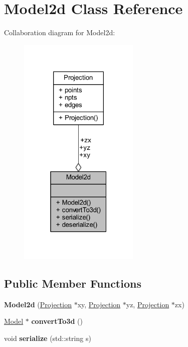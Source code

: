 \hypertarget{class_model2d}{}\section{Model2d Class Reference}
\label{class_model2d}


Collaboration diagram for Model2d\+:
\nopagebreak
\begin{figure}[H]
\begin{center}
\leavevmode
\includegraphics[width=163pt]{class_model2d__coll__graph}
\end{center}
\end{figure}
\subsection*{Public Member Functions}
\begin{DoxyCompactItemize}
\item 
\mbox{\label{class_model2d_aa07204b20301739146f8ecf525778720}} 
{\bfseries Model2d} (\mbox{\hyperlink{class_projection}{Projection}} $\ast$xy, \mbox{\hyperlink{class_projection}{Projection}} $\ast$yz, \mbox{\hyperlink{class_projection}{Projection}} $\ast$zx)
\item 
\mbox{\label{class_model2d_ab39a4f4a2c6430cee2b226a9509ec38b}} 
\mbox{\hyperlink{class_model}{Model}} $\ast$ {\bfseries convert\+To3d} ()
\item 
\mbox{\label{class_model2d_a9dbe9eafd94b347c3257ac90e743065c}} 
void {\bfseries serialize} (std\+::string s)
\end{DoxyCompactItemize}
